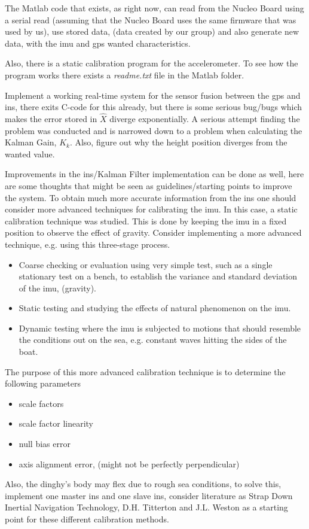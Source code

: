 The Matlab code that exists, as right now, can read from the Nucleo Board using a serial read (assuming that the Nucleo Board uses the same firmware that was used by us), use stored data, (data created by our group) and also generate new data, with the \gls{imu} and \gls{gps} wanted characteristics. 

Also, there is a static calibration program for the accelerometer. To see how the program works there exists a \emph{readme.txt} file in the Matlab folder.

Implement a working real-time system for the sensor fusion between the \gls{gps} and \gls{ins}, there exits C-code for this already, but there is some serious bug/bugs which makes the error stored in $\hat{X}$ diverge exponentially. A serious attempt finding the problem was conducted and is narrowed down to a problem when calculating the Kalman Gain, $K_k$. Also, figure out why the height position diverges from the wanted value.

Improvements in the \gls{ins}/Kalman Filter implementation can be done as well, here are some thoughts that might be seen as guidelines/starting points to improve the system. 
To obtain much more accurate information from the \gls{ins} one should consider more advanced techniques for calibrating the \gls{imu}. In this case, a static calibration technique was studied. This is done by keeping the \gls{imu} in a fixed position to observe the effect of gravity.
Consider implementing a more advanced technique, e.g. using this three-stage process.
\begin{itemize}[noitemsep]
\item Coarse checking or evaluation using very simple test, such as a single stationary test on a bench, to establish the variance and standard deviation of the \gls{imu}, (gravity).
\item Static testing and studying the effects of natural phenomenon on the \gls{imu}.
\item Dynamic testing where the \gls{imu} is subjected to motions that should resemble the conditions out on the sea, e.g. constant waves hitting the sides of the boat. 
\end{itemize}
The purpose of this more advanced calibration technique is to determine the following parameters\cite{non-linear}
\begin{itemize}[noitemsep]
\item scale factors
\item scale factor linearity
\item null bias error
\item axis alignment error, (might not be perfectly perpendicular)
\end{itemize}
Also, the dinghy's body may flex due to rough sea conditions, to solve this, implement one master \gls{ins} and one slave \gls{ins}, consider literature as Strap Down Inertial Navigation Technology, D.H. Titterton and J.L. Weston as a starting point for these different calibration methods.

